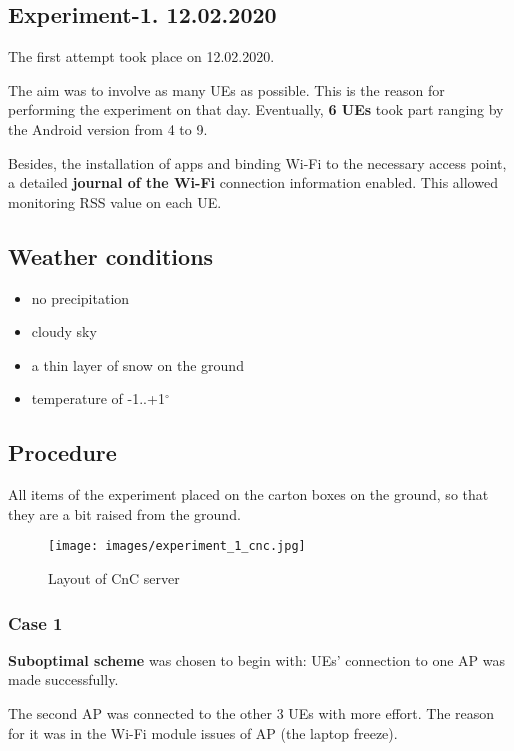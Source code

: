 \subsection{Experiment-1. 12.02.2020}\label{experiment-1.-12.02.2020}

The first attempt took place on 12.02.2020.

The aim was to involve as many UEs as possible. This is the reason for performing the experiment on that day. Eventually, \textbf{6 UEs} took part ranging by the Android version from 4 to 9.

Besides, the installation of apps and binding Wi-Fi to the necessary
access point, a detailed \textbf{journal of the Wi-Fi} connection
information enabled. This allowed monitoring RSS value on each UE.

\subsection{Weather conditions}

\begin{itemize}
\tightlist
\item
  no precipitation
\item
  cloudy sky
\item
  a thin layer of snow on the ground
\item
  temperature of -1..+1$^\circ$
\end{itemize}

\subsection{Procedure}

All items of the experiment placed on the carton boxes on the ground, so that they are a bit raised from the ground.

\begin{figure}[H]
	\centering
	\texttt{[image: images/experiment\_1\_cnc.jpg]}
\caption{Layout of CnC server}
\end{figure}

\subsubsection{Case 1}

\textbf{Suboptimal scheme} was chosen to begin with: UEs' connection to one AP was made successfully.

The second AP was connected to the other 3 UEs with more effort. The reason for it was in the Wi-Fi module issues of AP  (the laptop freeze).

